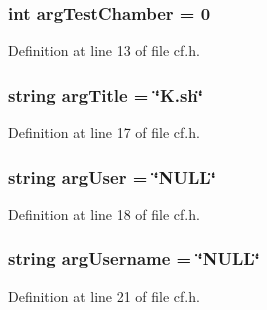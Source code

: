\subsubsection[{\texorpdfstring{arg\+Test\+Chamber}{argTestChamber}}]{\setlength{\rightskip}{0pt plus 5cm}int arg\+Test\+Chamber = 0}\hypertarget{class_k_1_1_c_f_a470f837189c8cb88935532c65444c298}{}\label{class_k_1_1_c_f_a470f837189c8cb88935532c65444c298}


Definition at line 13 of file cf.\+h.

\subsubsection[{\texorpdfstring{arg\+Title}{argTitle}}]{\setlength{\rightskip}{0pt plus 5cm}string arg\+Title = \char`\"{}K.\+sh\char`\"{}}\hypertarget{class_k_1_1_c_f_ad88b2c38f30af5bfb88ddec1e06b6ead}{}\label{class_k_1_1_c_f_ad88b2c38f30af5bfb88ddec1e06b6ead}


Definition at line 17 of file cf.\+h.

\subsubsection[{\texorpdfstring{arg\+User}{argUser}}]{\setlength{\rightskip}{0pt plus 5cm}string arg\+User = \char`\"{}N\+U\+LL\char`\"{}}\hypertarget{class_k_1_1_c_f_a892f38e1aca5d77e44a7b21f70710ebe}{}\label{class_k_1_1_c_f_a892f38e1aca5d77e44a7b21f70710ebe}


Definition at line 18 of file cf.\+h.

\subsubsection[{\texorpdfstring{arg\+Username}{argUsername}}]{\setlength{\rightskip}{0pt plus 5cm}string arg\+Username = \char`\"{}N\+U\+LL\char`\"{}}\hypertarget{class_k_1_1_c_f_a330672ad82dc3b07df05e5515d1bc0c1}{}\label{class_k_1_1_c_f_a330672ad82dc3b07df05e5515d1bc0c1}


Definition at line 21 of file cf.\+h.

